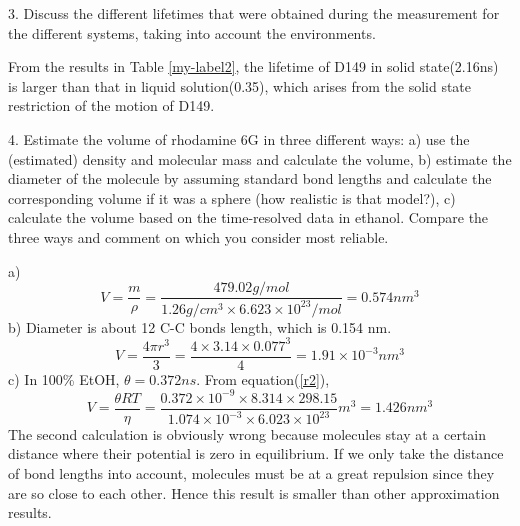 \documentclass{article}
\begin{document}
3. Discuss the different lifetimes that were obtained during the measurement for the different systems,
taking into account the environments. \\ \par 

From the results in Table \ref{my-label2}, the lifetime of D149 in solid state(2.16ns) is larger than that in liquid solution(0.35), which arises from the solid state restriction of the motion of D149.\\ \par 

4. Estimate the volume of rhodamine 6G in three different ways: a) use the (estimated) density and
molecular mass and calculate the volume, b) estimate the diameter of the molecule by assuming standard
bond lengths and calculate the corresponding volume if it was a sphere (how realistic is that model?), c)
calculate the volume based on the time-resolved data in ethanol.
Compare the three ways and comment on which you consider most reliable. \\ \par 
a) 
\begin{equation*}
V=\frac{m}{\rho}=\frac{479.02 g/mol}{1.26 g/cm^3\times 6.623\times 10^{23}/mol}=0.574 nm^3
\end{equation*}
b) Diameter is about 12 C-C bonds length, which is 0.154 nm.  
\begin{equation*}
V=\frac{4\pi r^3}{3}=\frac{4\times 3.14\times 0.077^3}{4}=1.91\times 10^{-3} nm^3
\end{equation*}
c) In 100\% EtOH, $\theta = 0.372ns$. From equation(\ref{r2}),
\begin{equation}
V= \frac{\theta RT}{\eta} =\frac{0.372\times 10^{-9} \times 8.314 \times 298.15}{1.074\times 10^{-3}\times 6.023\times 10^{23}} m^{3}=1.426 nm^3
\end{equation}  
The second calculation is obviously wrong because molecules stay at a certain distance where their potential is zero in equilibrium. If we only take the distance of bond lengths into account, molecules must be at a great repulsion since they are so close to each other. Hence this result is smaller than other approximation results. \\ \par 
\end{document}

